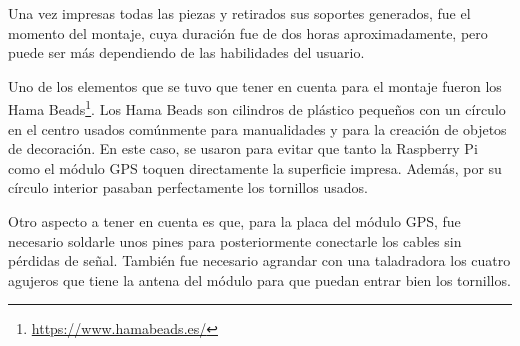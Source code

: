 Una vez impresas todas las piezas y retirados sus soportes generados, fue el momento del montaje, cuya duración fue de dos horas aproximadamente, pero puede ser más dependiendo de las habilidades del usuario.

Uno de los elementos que se tuvo que tener en cuenta para el montaje fueron los Hama Beads\footnote{\url{https://www.hamabeads.es/}}. Los Hama Beads son cilindros de plástico pequeños con un círculo en el centro usados comúnmente para manualidades y para la creación de objetos de decoración. En este caso, se usaron para evitar que tanto la Raspberry Pi como el módulo \acs{GPS} toquen directamente la superficie impresa. Además, por su círculo interior pasaban perfectamente los tornillos usados. 





Otro aspecto a tener en cuenta es que, para la placa del módulo \acs{GPS}, fue necesario soldarle unos pines para posteriormente conectarle los cables sin pérdidas de señal. También fue necesario agrandar con una taladradora los cuatro agujeros que tiene la antena del módulo para que puedan entrar bien los tornillos. 



